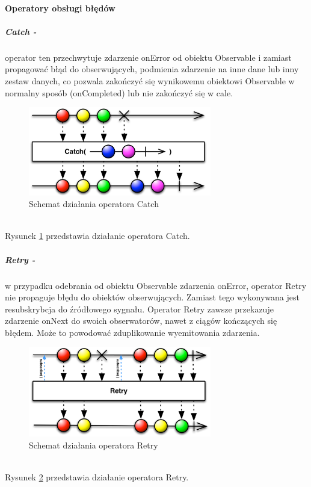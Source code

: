 \documentclass[12pt,oneside,a4paper]{report}
\begin{document}
\paragraph{Operatory obsługi błędów}
\subparagraph{Catch -}operator ten przechwytuje zdarzenie onError od obiektu Observable i zamiast propagować błąd do obserwujących, podmienia zdarzenie na inne dane lub inny zestaw danych, co pozwala zakończyć się wynikowemu obiektowi Observable w normalny sposób (onCompleted) lub nie zakończyć się w cale.
\begin{figure}[ht!]
	\centering
	\includegraphics[width=8cm]{catch}
	\caption{Schemat działania operatora Catch\cite{operators}}
	\label{catch}
\end{figure}\\
Rysunek \ref{catch} przedstawia działanie operatora Catch.
\subparagraph{Retry -}w przypadku odebrania od obiektu Observable zdarzenia onError, operator Retry nie propaguje błędu do obiektów obserwujących. Zamiast tego wykonywana jest resubskrybcja do źródłowego sygnału. Operator Retry zawsze przekazuje zdarzenie onNext do swoich obserwatorów, nawet z ciągów kończących się błędem. Może to powodować zduplikowanie wyemitowania zdarzenia.
\begin{figure}[ht!]
	\centering
	\includegraphics[width=8cm]{retry}
	\caption{Schemat działania operatora Retry\cite{operators}}
	\label{retry}
\end{figure}\\
Rysunek \ref{retry} przedstawia działanie operatora Retry.
\end{document}
